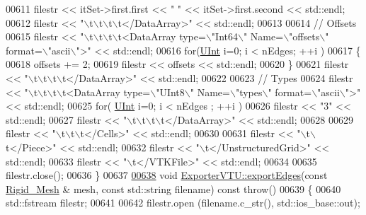\begin{DoxyCode}
00611         filestr << itSet->first.first << \textcolor{stringliteral}{" "} << itSet->first.second << std::endl;
00612     filestr << \textcolor{stringliteral}{"\(\backslash\)t\(\backslash\)t\(\backslash\)t\(\backslash\)t</DataArray>"} << std::endl;
00613 
00614     \textcolor{comment}{//  Offsets}
00615     filestr << \textcolor{stringliteral}{"\(\backslash\)t\(\backslash\)t\(\backslash\)t\(\backslash\)t<DataArray type=\(\backslash\)"Int64\(\backslash\)" Name=\(\backslash\)"offsets\(\backslash\)" format=\(\backslash\)"ascii\(\backslash\)">"} << std::endl;
00616     \textcolor{keywordflow}{for}(\hyperlink{namespaceFVCode3D_a4bf7e328c75d0fd504050d040ebe9eda}{UInt} i=0; i < nEdges; ++i )
00617     \{
00618         offsets += 2;
00619         filestr << offsets << std::endl;
00620     \}
00621     filestr << \textcolor{stringliteral}{"\(\backslash\)t\(\backslash\)t\(\backslash\)t\(\backslash\)t</DataArray>"} << std::endl;
00622 
00623     \textcolor{comment}{//  Types}
00624     filestr << \textcolor{stringliteral}{"\(\backslash\)t\(\backslash\)t\(\backslash\)t\(\backslash\)t<DataArray type=\(\backslash\)"UInt8\(\backslash\)" Name=\(\backslash\)"types\(\backslash\)" format=\(\backslash\)"ascii\(\backslash\)">"} << std::endl;
00625     \textcolor{keywordflow}{for}( \hyperlink{namespaceFVCode3D_a4bf7e328c75d0fd504050d040ebe9eda}{UInt} i=0; i < nEdges ; ++i )
00626         filestr << \textcolor{stringliteral}{"3"} << std::endl;
00627     filestr << \textcolor{stringliteral}{"\(\backslash\)t\(\backslash\)t\(\backslash\)t\(\backslash\)t</DataArray>"} << std::endl;
00628 
00629     filestr << \textcolor{stringliteral}{"\(\backslash\)t\(\backslash\)t\(\backslash\)t</Cells>"} << std::endl;
00630 
00631     filestr << \textcolor{stringliteral}{"\(\backslash\)t\(\backslash\)t</Piece>"} << std::endl;
00632     filestr << \textcolor{stringliteral}{"\(\backslash\)t</UnstructuredGrid>"} << std::endl;
00633     filestr << \textcolor{stringliteral}{"\(\backslash\)t</VTKFile>"} << std::endl;
00634 
00635     filestr.close();
00636 \}
00637 
\hypertarget{ExportVTU_8cpp_source.tex_l00638}{}\hyperlink{classFVCode3D_1_1ExporterVTU_a3ee8f96689d31f85372b580caffdcc7e}{00638} \textcolor{keywordtype}{void} \hyperlink{classFVCode3D_1_1ExporterVTU_a3ee8f96689d31f85372b580caffdcc7e}{ExporterVTU::exportEdges}(\textcolor{keyword}{const} \hyperlink{classFVCode3D_1_1Rigid__Mesh}{Rigid\_Mesh} & mesh, \textcolor{keyword}{const} std::string 
      filename) \textcolor{keyword}{const} \textcolor{keywordflow}{throw}()
00639 \{
00640     std::fstream filestr;
00641 
00642     filestr.open (filename.c\_str(), std::ios\_base::out);

\end{DoxyCode}
